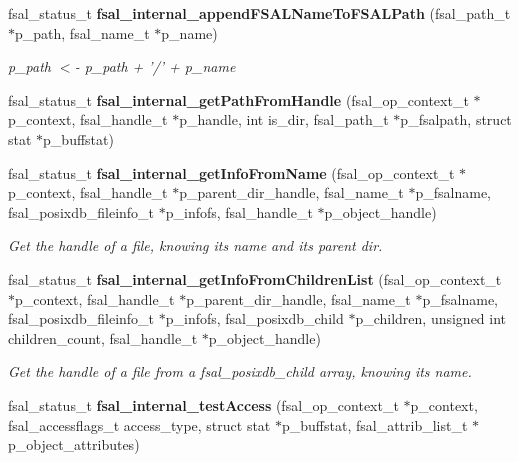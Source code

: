 \begin{CompactItemize}
\item 
fsal\_\-status\_\-t {\bf fsal\_\-internal\_\-appendFSALNameToFSALPath} (fsal\_\-path\_\-t $\ast$p\_\-path, fsal\_\-name\_\-t $\ast$p\_\-name)
\begin{CompactList}\small\item\em p\_\-path $<$- p\_\-path + '/' + p\_\-name \item\end{CompactList}\item 
fsal\_\-status\_\-t {\bf fsal\_\-internal\_\-getPathFromHandle} (fsal\_\-op\_\-context\_\-t $\ast$p\_\-context, fsal\_\-handle\_\-t $\ast$p\_\-handle, int is\_\-dir, fsal\_\-path\_\-t $\ast$p\_\-fsalpath, struct stat $\ast$p\_\-buffstat)
\item 
fsal\_\-status\_\-t {\bf fsal\_\-internal\_\-getInfoFromName} (fsal\_\-op\_\-context\_\-t $\ast$p\_\-context, fsal\_\-handle\_\-t $\ast$p\_\-parent\_\-dir\_\-handle, fsal\_\-name\_\-t $\ast$p\_\-fsalname, fsal\_\-posixdb\_\-fileinfo\_\-t $\ast$p\_\-infofs, fsal\_\-handle\_\-t $\ast$p\_\-object\_\-handle)
\begin{CompactList}\small\item\em Get the handle of a file, knowing its name and its parent dir. \item\end{CompactList}\item 
fsal\_\-status\_\-t {\bf fsal\_\-internal\_\-getInfoFromChildrenList} (fsal\_\-op\_\-context\_\-t $\ast$p\_\-context, fsal\_\-handle\_\-t $\ast$p\_\-parent\_\-dir\_\-handle, fsal\_\-name\_\-t $\ast$p\_\-fsalname, fsal\_\-posixdb\_\-fileinfo\_\-t $\ast$p\_\-infofs, fsal\_\-posixdb\_\-child $\ast$p\_\-children, unsigned int children\_\-count, fsal\_\-handle\_\-t $\ast$p\_\-object\_\-handle)
\begin{CompactList}\small\item\em Get the handle of a file from a fsal\_\-posixdb\_\-child array, knowing its name. \item\end{CompactList}\item 
fsal\_\-status\_\-t \textbf{fsal\_\-internal\_\-testAccess} (fsal\_\-op\_\-context\_\-t $\ast$p\_\-context, fsal\_\-accessflags\_\-t access\_\-type, struct stat $\ast$p\_\-buffstat, fsal\_\-attrib\_\-list\_\-t $\ast$p\_\-object\_\-attributes)\label{fsal__internal_8c_f615cc11936b1417a67c43a6772c4a44}

\end{CompactItemize}
